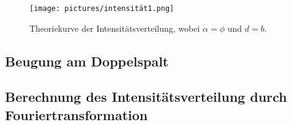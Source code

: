 \begin{figure}[H]
    \centering
    \texttt{[image: pictures/intensität1.png]}
    \caption{Theoriekurve der Intensitätsverteilung, wobei $\alpha=\phi$ und $d=b$. \cite{AP03}}
    \label{fig:frauenhofer2}
\end{figure}

\subsection{Beugung am Doppelspalt}
\label{sec:doppel}
\subsection{Berechnung des Intensitätsverteilung durch Fouriertransformation}
\label{sec:fourier}